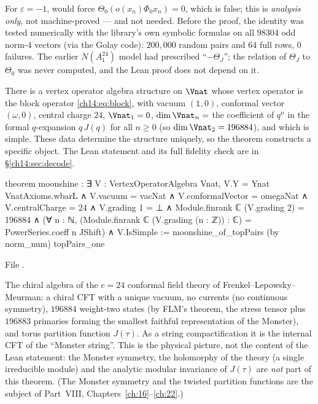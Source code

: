 \begin{warning}[title={Trap / dead end: The sign $\varepsilon$ and the earlier numerics}]
For $\varepsilon=-1$,  would force $\Theta_0(o(x_n)\Phi_0x_n)=0$, which is false; this is
\emph{analysis only}, not machine-proved — and not needed.  Before the proof, the identity was tested
numerically with the library's own symbolic formulas on all $98304$ odd norm-4 vectors (via the Golay
code): $200{,}000$ random pairs and $64$ full rows, $0$ failures.  The earlier $N(A_1^{24})$ model
had prescribed ``$-\Theta_J$''; the relation of $\Theta_J$ to $\Theta_0$ was never computed, and the Lean proof
does not depend on it.
\end{warning}

\begin{theorem}\label{ch14:thm:moonshine}
There is a vertex operator algebra structure on $\Vnat$ whose vertex operator is the block operator
\eqref{ch14:eq:block}, with vacuum $(\mathbb 1,0)$, conformal vector $(\omega,0)$, central charge $24$,
$\Vnat_1=0$, $\dim\Vnat_n=$ the coefficient of $q^n$ in the formal $q$-expansion $q\,J(q)$ for all $n\ge0$
(so $\dim\Vnat_2=196884$), and which is simple.  These data determine the structure uniquely, so the
theorem constructs a specific object.  The Lean statement and its full fidelity check are in
\S\ref{ch14:sec:decode}.
\end{theorem}
\begin{leancode}
theorem moonshine :
    ∃ V : VertexOperatorAlgebra Vnat,
      V.Y = Ynat VnatAxioms.wbarL ∧ V.vacuum = vacNat ∧ V.conformalVector = omegaNat ∧
      V.centralCharge = 24 ∧
      V.grading 1 = ⊥ ∧
      Module.finrank ℂ (V.grading 2) = 196884 ∧
      (∀ n : ℕ, (Module.finrank ℂ (V.grading (n : ℤ)) : ℂ) = PowerSeries.coeff n JShift) ∧
      V.IsSimple :=
  moonshine_of_topPairs (by norm_num) topPairs_one
\end{leancode}
File .

\begin{physics}
The chiral algebra of the $c=24$ conformal field theory of Frenkel--Lepowsky--Meurman: a
chiral CFT with a unique vacuum, no currents (no continuous symmetry), $196884$ weight-two states
(by FLM's theorem, the stress tensor plus $196883$ primaries forming the smallest faithful
representation of the Monster), and torus partition function $J(\tau)$.  As a string
compactification it is the internal CFT of the ``Monster string''.  This is the physical picture,
not the content of the Lean statement: the Monster symmetry, the holomorphy of the theory (a single
irreducible module) and the analytic modular invariance of $J(\tau)$ are \emph{not} part of this
theorem.  (The Monster symmetry and the twisted partition functions are the subject of Part~VIII,
Chapters~\ref{ch:16}--\ref{ch:22}.)
\end{physics}

